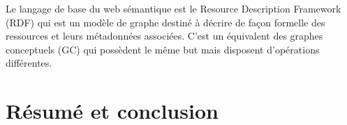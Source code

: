 Le langage de base du web sémantique est le Resource Description Framework (RDF) qui est un modèle de graphe destiné à décrire de façon formelle des ressources et leurs métadonnées associées. C'est un équivalent des graphes conceptuels (GC) qui possèdent le même but mais disposent d'opérations différentes.







\section{Résumé et conclusion}
\label{sec:ConclusionDigitartic}
\lipsum[1-2]

